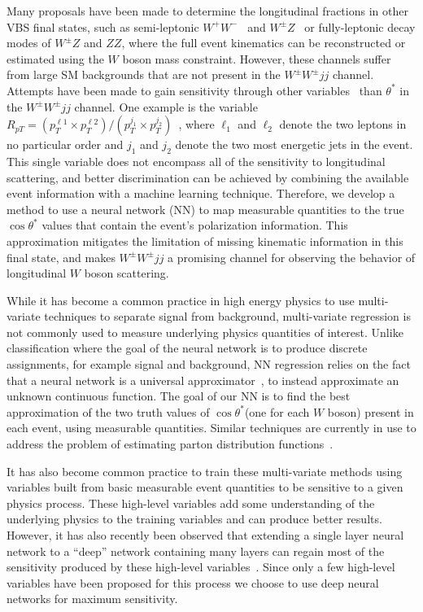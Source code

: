 \documentclass[aps,prl,twocolumn,showpacs,superscriptaddress,groupeaddress,floatfix]{revtex4}
\def\ssWW{\ensuremath{ W^{\pm}W^{\pm}jj }\xspace}
\def\ts{\ensuremath{ \theta^{*} }\xspace}
\def\cts{\ensuremath{ \cos\ts }\xspace}
\begin{document}
Many proposals have been made to determine the longitudinal fractions in other VBS final states, such as semi-leptonic
$W^+W^-$~\cite{Han:2009em} and $W^\pm Z$~\cite{VBSCuts1} or
fully-leptonic decay modes of $W^\pm Z$ and $ZZ$, where the full
event kinematics can be reconstructed or estimated using the $W$ boson mass constraint. 
However, these channels suffer from large SM backgrounds that are not present in the \ssWW channel. Attempts have been made 
to gain sensitivity through other variables~\cite{SSC_1,VBSCuts1,VBSME,Doroba:2012pd,new_VBS_warsaw_cut} than \ts in the \ssWW
channel. One example is the variable $R_{pT}=(p_{T}^{\ell 1} \times
p_{T}^{\ell 2}) / (p_T^{j_1} \times p_T^{j_2})$~\cite{Doroba:2012pd},
where $\ell_1$ and $\ell_2$ denote the two leptons in no particular
order and $j_1$ and $j_2$ denote the two most energetic jets in the
event. This single variable does not encompass all of the
sensitivity to longitudinal scattering, and better discrimination can
be achieved by combining the available event information with a
machine learning technique. Therefore, we develop a method to use a
neural network (NN) to map measurable quantities to the true \cts values
that contain the event's polarization information. This
approximation mitigates the limitation of missing kinematic information
in this final state, and makes \ssWW a promising channel for observing
the behavior of longitudinal $W$ boson scattering.
 
 
While it has become a common practice in high energy physics to use
multi-variate techniques to separate signal from background,
multi-variate regression is not commonly used to measure underlying
physics quantities of interest.  Unlike classification where the goal
of the neural network is to produce discrete assignments, for example
signal and background, NN regression relies on the fact that a neural
network is a universal approximator~\cite{NN_1}, to instead
approximate an unknown continuous function.  The goal of our NN is to
find the best approximation of the two truth values of \cts (one for
each $W$ boson) present in each event, using measurable
quantities. Similar techniques are currently in use to address the
problem of estimating parton distribution functions~\cite{NNPDF}.

It has also become common practice to train these multi-variate
methods using variables built from basic measurable event quantities
to be sensitive to a given physics process. These high-level variables
add some understanding of the underlying physics to the training
variables and can produce better results. However, it has also
recently been observed that extending a single layer neural network to
a ``deep'' network containing many layers can regain most of the
sensitivity produced by these high-level
variables~\cite{Baldi:2014kfa,Baldi:2014pta}. Since only a few
high-level variables have been proposed for this process we choose to
use deep neural networks for maximum sensitivity.
\end{document}
